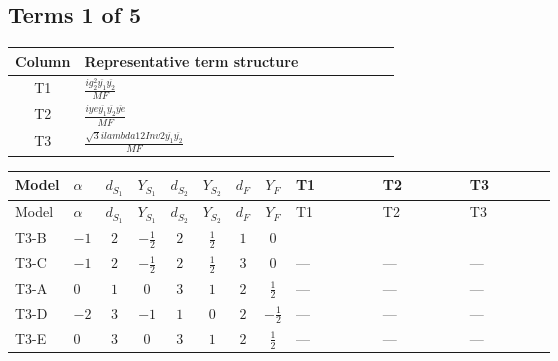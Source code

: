 \documentclass[8pt]{article}
\begin{document}
\begin{landscape}
\subsection*{Terms 1 of 5}
\begin{center}
\begin{tabular}{@{}c >{\raggedright\arraybackslash}p{0.82\linewidth}@{}}
\toprule
Column & Representative term structure \\
\midrule
T1 & \(\displaystyle \frac{i g_{2}^{2} \overline{y_{1}} \overline{y_{2}}}{MF}\) \\
\midrule
T2 & \(\displaystyle \frac{i ye \overline{y_{1}} \overline{y_{2}} \overline{ye}}{MF}\) \\
\midrule
T3 & \(\displaystyle \frac{\sqrt{3} i lambda12Inv2 \overline{y_{1}} \overline{y_{2}}}{MF}\) \\
\midrule
\bottomrule
\end{tabular}
\end{center}
\smallskip
\tiny
\begin{longtable}{@{}llcccccc >{\raggedright\arraybackslash}p{0.21\linewidth} >{\raggedright\arraybackslash}p{0.21\linewidth} >{\raggedright\arraybackslash}p{0.21\linewidth}@{}}
\toprule
Model & $\alpha$ & $d_{S_1}$ & $Y_{S_1}$ & $d_{S_2}$ & $Y_{S_2}$ & $d_F$ & $Y_F$ & T1 & T2 & T3 \\
\midrule
\endfirsthead
\toprule
Model & $\alpha$ & $d_{S_1}$ & $Y_{S_1}$ & $d_{S_2}$ & $Y_{S_2}$ & $d_F$ & $Y_F$ & T1 & T2 & T3 \\
\midrule
\endhead
T3-B & $-1$ & $2$ & $-\frac{1}{2}$ & $2$ & $\frac{1}{2}$ & $1$ & $0$ & \scriptsize\adjustbox{max width=\linewidth}{$\begin{gathered} \frac{3 i g_{2}^{2} \overline{y_{1}} \overline{y_{2}}}{4 MF}\end{gathered}$} & \scriptsize\adjustbox{max width=\linewidth}{$\begin{gathered} - \frac{i ye \overline{y_{1}} \overline{y_{2}} \overline{ye}}{4 MF}\end{gathered}$} & \scriptsize\adjustbox{max width=\linewidth}{$\begin{gathered} \frac{\sqrt{3} i lambda12Inv2 \overline{y_{1}} \overline{y_{2}}}{3 MF}\end{gathered}$} \\
\midrule
T3-C & $-1$ & $2$ & $-\frac{1}{2}$ & $2$ & $\frac{1}{2}$ & $3$ & $0$ & --- & --- & --- \\
\midrule
T3-A & $0$ & $1$ & $0$ & $3$ & $1$ & $2$ & $\frac{1}{2}$ & --- & --- & --- \\
\midrule
T3-D & $-2$ & $3$ & $-1$ & $1$ & $0$ & $2$ & $-\frac{1}{2}$ & --- & --- & --- \\
\midrule
T3-E & $0$ & $3$ & $0$ & $3$ & $1$ & $2$ & $\frac{1}{2}$ & --- & --- & --- \\
\midrule
\bottomrule
\end{longtable}
\clearpage

\end{landscape}
\end{document}
